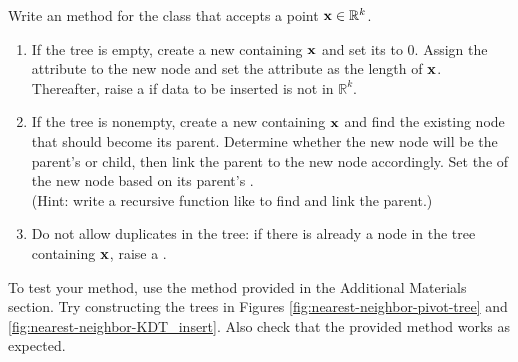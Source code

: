 \begin{problem} %
\label{prob:kdt-insert}
Write an  method for the  class that accepts a point $\mathbf{x}\in\mathbb{R}^k$.
\begin{enumerate}
\item If the tree is empty, create a new  containing $\mathbf{x}$ and set its  to $0$.
Assign the  attribute to the new node and set the  attribute as the length of $\mathbf{x}$.
Thereafter, raise a  if data to be inserted is not in $\mathbb{R}^k$.
\item If the tree is nonempty, create a new  containing $\mathbf{x}$ and find the existing node that should become its parent.
Determine whether the new node will be the parent's  or  child, then link the parent to the new node accordingly.
Set the  of the new node based on its parent's .
\\(Hint: write a recursive function like  to find and link the parent.)
\item Do not allow duplicates in the tree: if there is already a node in the tree containing $\mathbf{x}$, raise a .
\end{enumerate}
To test your method, use the  method provided in the Additional Materials section.
Try constructing the trees in Figures \ref{fig:nearest-neighbor-pivot-tree} and \ref{fig:nearest-neighbor-KDT_insert}.
Also check that the provided  method works as expected.
\end{problem}

